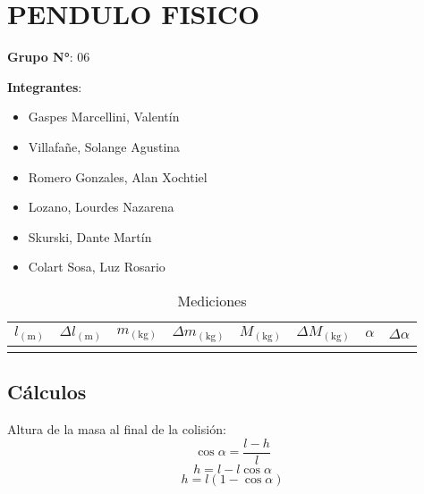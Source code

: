 \documentclass[a4paper]{article}
\begin{document}
\makeatletter
\renewcommand{\@seccntformat}[1]{}
\makeatother
\section{PENDULO FISICO} %
\label{sec:pendulo_fisico}

\vspace{1cm}
\textbf{Grupo N°}: 06

\vspace{1cm}

\textbf{Integrantes}:
\begin{itemize}
    \item Gaspes Marcellini, Valentín
    \item Villafañe, Solange Agustina
    \item Romero Gonzales, Alan Xochtiel
    \item Lozano, Lourdes Nazarena
    \item Skurski, Dante Martín
    \item Colart Sosa, Luz Rosario
\end{itemize}

\vspace{2cm}
\begin{table}[h]
    \centering
    \begin{tabularx}{1\textwidth}{
      | >{\centering\arraybackslash}X   | >{\centering\arraybackslash}X   | >{\centering\arraybackslash}X   | >{\centering\arraybackslash}X   | >{\centering\arraybackslash}X   | >{\centering\arraybackslash}X   | >{\centering\arraybackslash}X   | >{\centering\arraybackslash}X |
    }
        \hline
        \( l_{(\mbox{m})} \) & \( \Delta l _{(\mbox{m})}\) & \( m_{(\mbox{kg})} \) & \( \Delta m_{(\mbox{kg})} \) & \( M_{(\mbox{kg})} \) & \( \Delta M_{(\mbox{kg})} \) & \( \alpha \) & \( \Delta \alpha \) \\ \hline
                & & & & & & & \\ \hline
    \end{tabularx}
    \caption{Mediciones}
\end{table}

\subsection{Cálculos} %
\label{sub:calculos}
Altura de la masa al final de la colisión:
\[ \cos\alpha = \frac{l-h}{l} \]
\[ h = l - l\cos\alpha \]
\[ h = l(1-\cos\alpha) \]
\end{document}
